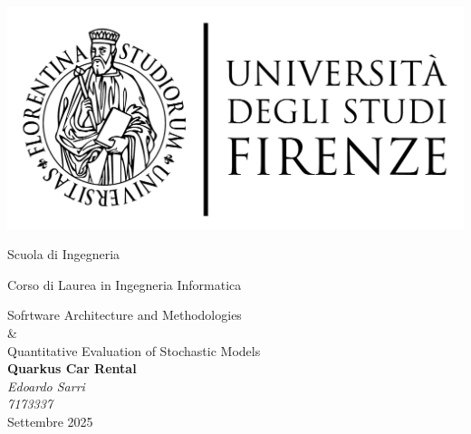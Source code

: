 \newcommand{\scuola}{
	{\fontsize{18pt}{\baselineskip}\selectfont Scuola di Ingegneria}}
\newcommand{\corso}{
    {\fontsize{16pt}{\baselineskip}\selectfont Corso di Laurea in Ingegneria Informatica}}
\newcommand{\lezione}{
	{\fontsize{14pt}{\baselineskip}\selectfont Sofrtware Architecture and Methodologies \\ \& \\ Quantitative Evaluation of Stochastic Models}}

\begin{titlepage}
    \centering
    \vspace{1cm}
    \includegraphics[scale=0.3]{images/logo UniFi.pdf} \\
    \vspace{1cm}
    \scuola \\
    \vspace{0.5cm}
    \corso \\
    \vspace{0.5cm}
    \lezione \\
    \vspace{4cm}
    {\Huge\bfseries Quarkus Car Rental} \\
    \vspace{2cm}
    {\Large\itshape Edoardo Sarri} \\
    \vspace{0.5cm}
    {\Large\itshape 7173337} \\
    \vfill
    {\fontsize{16pt}{\baselineskip}\selectfont Settembre 2025}
\end{titlepage}
